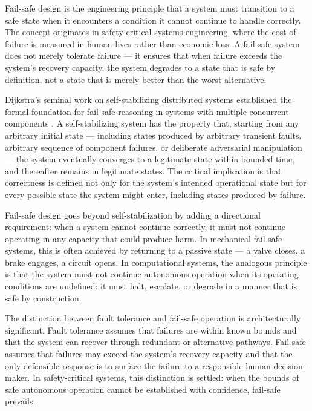 Fail-safe design is the engineering principle that a system must transition to a safe state when it encounters a condition it cannot continue to handle correctly. The concept originates in safety-critical systems engineering, where the cost of failure is measured in human lives rather than economic loss. A fail-safe system does not merely tolerate failure --- it ensures that when failure exceeds the system's recovery capacity, the system degrades to a state that is safe by definition, not a state that is merely better than the worst alternative.

Dijkstra's seminal work on self-stabilizing distributed systems established the formal foundation for fail-safe reasoning in systems with multiple concurrent components \cite{dijkstra1982}. A self-stabilizing system has the property that, starting from any arbitrary initial state --- including states produced by arbitrary transient faults, arbitrary sequence of component failures, or deliberate adversarial manipulation --- the system eventually converges to a legitimate state within bounded time, and thereafter remains in legitimate states. The critical implication is that correctness is defined not only for the system's intended operational state but for every possible state the system might enter, including states produced by failure.

Fail-safe design goes beyond self-stabilization by adding a directional requirement: when a system cannot continue correctly, it must not continue operating in any capacity that could produce harm. In mechanical fail-safe systems, this is often achieved by returning to a passive state --- a valve closes, a brake engages, a circuit opens. In computational systems, the analogous principle is that the system must not continue autonomous operation when its operating conditions are undefined: it must halt, escalate, or degrade in a manner that is safe by construction.

The distinction between fault tolerance and fail-safe operation is architecturally significant. Fault tolerance assumes that failures are within known bounds and that the system can recover through redundant or alternative pathways. Fail-safe assumes that failures may exceed the system's recovery capacity and that the only defensible response is to surface the failure to a responsible human decision-maker. In safety-critical systems, this distinction is settled: when the bounds of safe autonomous operation cannot be established with confidence, fail-safe prevails.


